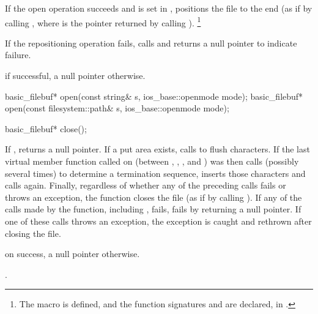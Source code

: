 \begin{itemdescr}
\pnum
If the open operation succeeds and
 is set in ,
positions the file to the end
(as if by calling , where
 is the pointer returned by calling ).%
\footnote{The macro 
is defined, and the function signatures
%
and
%
are declared, in .}

\pnum
If the repositioning operation fails, calls
and returns a null pointer to indicate failure.

\pnum
\returns
{}
if successful, a null pointer otherwise.
\end{itemdescr}

%
\begin{itemdecl}
basic_filebuf* open(const string& s, ios_base::openmode mode);
basic_filebuf* open(const filesystem::path& s, ios_base::openmode mode);
\end{itemdecl}

\begin{itemdescr}
\pnum
\returns
{}
\end{itemdescr}

%
\begin{itemdecl}
basic_filebuf* close();
\end{itemdecl}

\begin{itemdescr}
\pnum
\effects
If
,
returns a null pointer.
If a put area exists, calls
to flush characters.
If the last virtual member function called on
(between
,
,
,
and
)
was
then calls
(possibly several times) to determine a termination sequence, inserts those
characters and calls
again.
Finally, regardless of whether any of the preceding calls fails or throws an
exception, the function closes the file
(as if by calling
%
).
If any of the calls made by the function, including , fails,
 fails by returning a null pointer. If one of these calls throws an
exception, the exception is caught and rethrown after closing the file.

\pnum
\returns
{}
on success, a null pointer otherwise.

\pnum
\ensures
{}.
\end{itemdescr}

